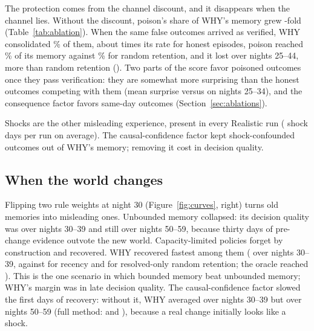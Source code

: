The protection comes from the channel discount, and it disappears when the channel lies. Without the discount, poison's share of WHY's memory grew -fold (Table~\ref{tab:ablation}). When the same false outcomes arrived as verified, WHY consolidated \% of them, about  times its rate for honest episodes, poison reached \% of its memory against \% for random retention, and it lost  over nights 25--44, more than random retention (). Two parts of the score favor poisoned outcomes once they pass verification: they are somewhat more surprising than the honest outcomes competing with them (mean surprise  versus  on nights 25--34), and the consequence factor favors same-day outcomes (Section~\ref{sec:ablations}).

Shocks are the other misleading experience, present in every Realistic run ( shock days per run on average). The causal-confidence factor kept shock-confounded outcomes out of WHY's memory; removing it cost  in decision quality.



\subsection{When the world changes}
Flipping two rule weights at night 30 (Figure~\ref{fig:curves}, right) turns old memories into misleading ones. Unbounded memory collapsed: its decision quality was  over nights 30--39 and still  over nights 50--59, because thirty days of pre-change evidence outvote the new world. Capacity-limited policies forget by construction and recovered. WHY recovered fastest among them ( over nights 30--39, against  for recency and  for resolved-only random retention; the oracle reached ). This is the one scenario in which bounded memory beat unbounded memory; WHY's margin was  in late decision quality. The causal-confidence factor slowed the first days of recovery: without it, WHY averaged  over nights 30--39 but  over nights 50--59 (full method:  and ), because a real change initially looks like a shock.


